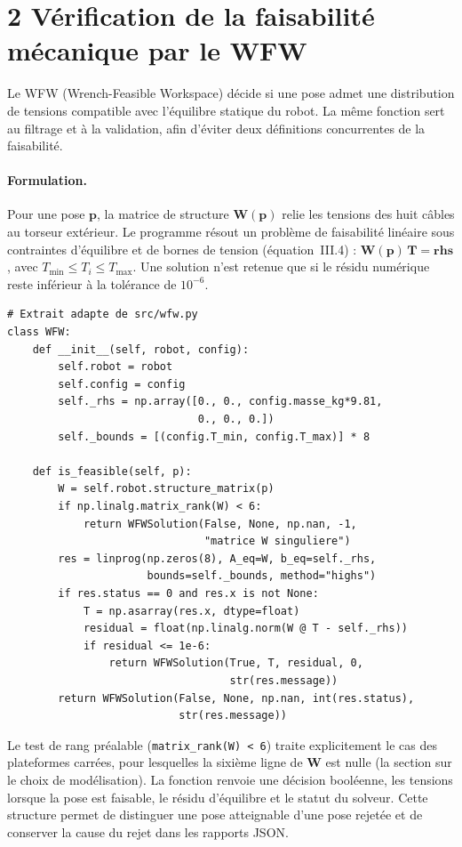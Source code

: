 \section*{2 Vérification de la faisabilité mécanique par le WFW}
\vspace{-0.3em}
Le WFW (Wrench-Feasible Workspace) décide si une pose admet une distribution de tensions compatible avec l'équilibre statique du robot. La même fonction sert au filtrage et à la validation, afin d'éviter deux définitions concurrentes de la faisabilité.

\paragraph{Formulation.}
Pour une pose $\mathbf{p}$, la matrice de structure $\mathbf{W}(\mathbf{p})$ relie les tensions des huit câbles au torseur extérieur. Le programme résout un problème de faisabilité linéaire sous contraintes d'équilibre et de bornes de tension (équation~III.4) : $\mathbf{W}(\mathbf{p})\,\mathbf{T} = \mathbf{rhs}$, avec $T_{\min} \leq T_i \leq T_{\max}$. Une solution n'est retenue que si le résidu numérique reste inférieur à la tolérance de $10^{-6}$.

\begin{lstlisting}[caption={Test de faisabilite d'une pose par programmation lineaire},label={lst:B2}]
# Extrait adapte de src/wfw.py
class WFW:
    def __init__(self, robot, config):
        self.robot = robot
        self.config = config
        self._rhs = np.array([0., 0., config.masse_kg*9.81,
                              0., 0., 0.])
        self._bounds = [(config.T_min, config.T_max)] * 8

    def is_feasible(self, p):
        W = self.robot.structure_matrix(p)
        if np.linalg.matrix_rank(W) < 6:
            return WFWSolution(False, None, np.nan, -1,
                               "matrice W singuliere")
        res = linprog(np.zeros(8), A_eq=W, b_eq=self._rhs,
                      bounds=self._bounds, method="highs")
        if res.status == 0 and res.x is not None:
            T = np.asarray(res.x, dtype=float)
            residual = float(np.linalg.norm(W @ T - self._rhs))
            if residual <= 1e-6:
                return WFWSolution(True, T, residual, 0,
                                   str(res.message))
        return WFWSolution(False, None, np.nan, int(res.status),
                           str(res.message))
\end{lstlisting}

Le test de rang préalable (\texttt{matrix\_rank(W) < 6}) traite explicitement le cas des plateformes carrées, pour lesquelles la sixième ligne de $\mathbf{W}$ est nulle (la section sur le choix de modélisation). La fonction renvoie une décision booléenne, les tensions lorsque la pose est faisable, le résidu d'équilibre et le statut du solveur. Cette structure permet de distinguer une pose atteignable d'une pose rejetée et de conserver la cause du rejet dans les rapports JSON.

